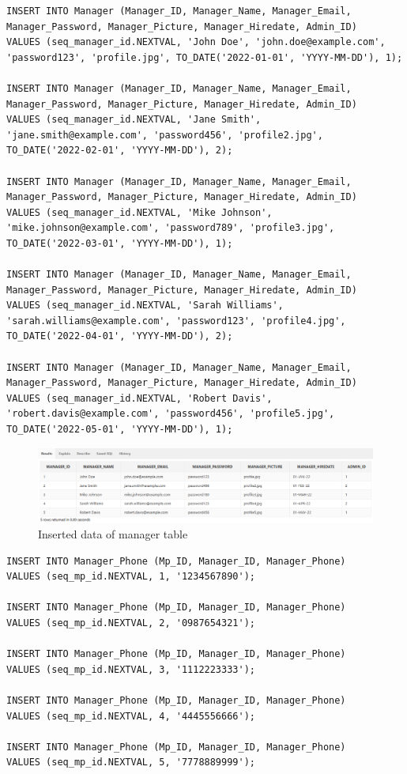 \begin{lstlisting}[caption={Inserting data into manager tables},label={lst:insert_manager}]
INSERT INTO Manager (Manager_ID, Manager_Name, Manager_Email, Manager_Password, Manager_Picture, Manager_Hiredate, Admin_ID)
VALUES (seq_manager_id.NEXTVAL, 'John Doe', 'john.doe@example.com', 'password123', 'profile.jpg', TO_DATE('2022-01-01', 'YYYY-MM-DD'), 1);

INSERT INTO Manager (Manager_ID, Manager_Name, Manager_Email, Manager_Password, Manager_Picture, Manager_Hiredate, Admin_ID)
VALUES (seq_manager_id.NEXTVAL, 'Jane Smith', 'jane.smith@example.com', 'password456', 'profile2.jpg', TO_DATE('2022-02-01', 'YYYY-MM-DD'), 2);

INSERT INTO Manager (Manager_ID, Manager_Name, Manager_Email, Manager_Password, Manager_Picture, Manager_Hiredate, Admin_ID)
VALUES (seq_manager_id.NEXTVAL, 'Mike Johnson', 'mike.johnson@example.com', 'password789', 'profile3.jpg', TO_DATE('2022-03-01', 'YYYY-MM-DD'), 1);

INSERT INTO Manager (Manager_ID, Manager_Name, Manager_Email, Manager_Password, Manager_Picture, Manager_Hiredate, Admin_ID)
VALUES (seq_manager_id.NEXTVAL, 'Sarah Williams', 'sarah.williams@example.com', 'password123', 'profile4.jpg', TO_DATE('2022-04-01', 'YYYY-MM-DD'), 2);

INSERT INTO Manager (Manager_ID, Manager_Name, Manager_Email, Manager_Password, Manager_Picture, Manager_Hiredate, Admin_ID)
VALUES (seq_manager_id.NEXTVAL, 'Robert Davis', 'robert.davis@example.com', 'password456', 'profile5.jpg', TO_DATE('2022-05-01', 'YYYY-MM-DD'), 1);
\end{lstlisting}
\begin{figure}[H]
    \centering
    \includegraphics[width=1\textwidth]{images/TableData/MANAGER.png}
    \caption{Inserted data of manager table}
\end{figure}

\begin{lstlisting}[caption={Inserting data into manager phone tables},label={lst:insert_manager}]
INSERT INTO Manager_Phone (Mp_ID, Manager_ID, Manager_Phone)
VALUES (seq_mp_id.NEXTVAL, 1, '1234567890');

INSERT INTO Manager_Phone (Mp_ID, Manager_ID, Manager_Phone)
VALUES (seq_mp_id.NEXTVAL, 2, '0987654321');

INSERT INTO Manager_Phone (Mp_ID, Manager_ID, Manager_Phone)
VALUES (seq_mp_id.NEXTVAL, 3, '1112223333');

INSERT INTO Manager_Phone (Mp_ID, Manager_ID, Manager_Phone)
VALUES (seq_mp_id.NEXTVAL, 4, '4445556666');

INSERT INTO Manager_Phone (Mp_ID, Manager_ID, Manager_Phone)
VALUES (seq_mp_id.NEXTVAL, 5, '7778889999');
\end{lstlisting}


